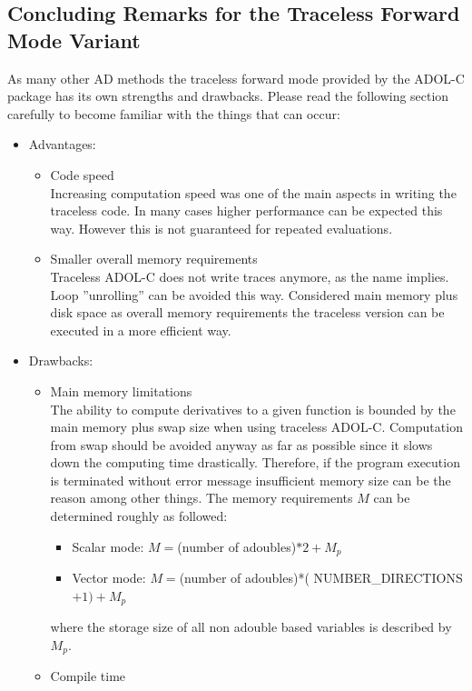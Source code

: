 \documentclass[11pt,twoside]{article}
\begin{document}
\subsection{Concluding Remarks for the Traceless Forward Mode Variant}
%
As many other AD methods the traceless forward mode provided by the
ADOL-C package has its own strengths and drawbacks. Please read the
following section carefully to become familiar with the things that
can occur: 
\begin{itemize}
  \item Advantages:
    \begin{itemize}
      \item Code speed\\
	Increasing computation speed was one of the main aspects in writing
	the traceless code. In many cases higher performance can be
	expected this way. However this is not guaranteed for repeated
        evaluations.
      \item Smaller overall memory requirements\\
	Traceless ADOL-C does not write traces anymore, as the name
	implies. Loop ''unrolling'' can be avoided this
	way. Considered main memory plus disk space as overall memory
	requirements the traceless version can be 
	executed in a more efficient way. 
    \end{itemize}
  \item Drawbacks:
    \begin{itemize}
    \item Main memory limitations\\
      The ability to compute derivatives to a given function is
      bounded by the main memory plus swap size  when using
      traceless ADOL-C. Computation from swap should be avoided anyway
      as far as possible since it slows down the computing time
      drastically. Therefore, if the program execution is  
      terminated without error message insufficient memory size can be
      the reason among other things. The memory requirements $M$ can
      be determined roughly as followed: 
      \begin{itemize}
        \item Scalar mode: $M=$(number of {\sf adouble}s)$*2 + M_p$
	\item Vector mode: $M=$(number of {\sf adouble}s)*({\sf
	  NUMBER\_DIRECTIONS}$+1) + M_p$ 
      \end{itemize}
      where the storage size of all non {\sf adouble} based variables is described by $M_p$.
    \item Compile time\\

\end{itemize}
\end{itemize}
\end{document}
